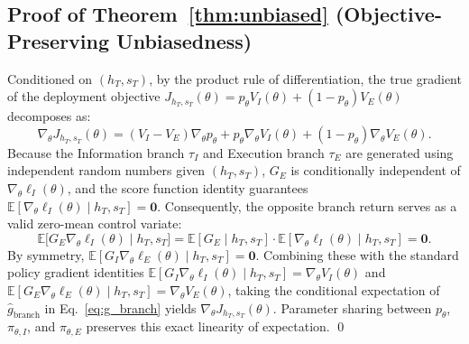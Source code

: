 \documentclass[11pt]{article}
\theoremstyle{definition}
\theoremstyle{remark}
\newcommand{\E}{\mathbb{E}}
\newcommand{\gbranch}{\widehat{g}_{\mathrm{branch}}}
\begin{document}
\subsection{Proof of Theorem~\ref{thm:unbiased} (Objective-Preserving Unbiasedness)}
Conditioned on $(h_T, s_T)$, by the product rule of differentiation, the true gradient of the deployment objective $J_{h_T, s_T}(\theta) = p_\theta V_I(\theta) + (1 - p_\theta)V_E(\theta)$ decomposes as:
\begin{equation}
    \nabla_\theta J_{h_T, s_T}(\theta) = (V_I - V_E)\nabla_\theta p_\theta + p_\theta \nabla_\theta V_I(\theta) + (1 - p_\theta)\nabla_\theta V_E(\theta).
\end{equation}
Because the Information branch $\tau_I$ and Execution branch $\tau_E$ are generated using independent random numbers given $(h_T, s_T)$, $G_E$ is conditionally independent of $\nabla_\theta \ell_I(\theta)$, and the score function identity guarantees $\E[\nabla_\theta \ell_I(\theta) \mid h_T, s_T] = \mathbf{0}$. Consequently, the opposite branch return serves as a valid zero-mean control variate:
\begin{equation}
    \E\bigl[G_E \nabla_\theta \ell_I(\theta) \mid h_T, s_T\bigr] = \E[G_E \mid h_T, s_T]\cdot \E[\nabla_\theta \ell_I(\theta) \mid h_T, s_T] = \mathbf{0}.
\end{equation}
By symmetry, $\E[G_I \nabla_\theta \ell_E(\theta) \mid h_T, s_T] = \mathbf{0}$. Combining these with the standard policy gradient identities $\E[G_I \nabla_\theta \ell_I(\theta) \mid h_T, s_T] = \nabla_\theta V_I(\theta)$ and $\E[G_E \nabla_\theta \ell_E(\theta) \mid h_T, s_T] = \nabla_\theta V_E(\theta)$, taking the conditional expectation of $\gbranch$ in Eq.~\eqref{eq:g_branch} yields $\nabla_\theta J_{h_T, s_T}(\theta)$. Parameter sharing between $p_\theta$, $\pi_{\theta, I}$, and $\pi_{\theta, E}$ preserves this exact linearity of expectation. \qed
\end{document}
